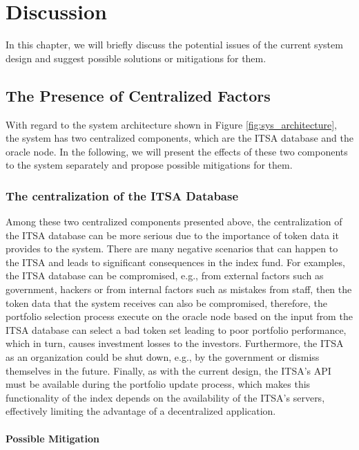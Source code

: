 \chapter{Discussion}\label{chapter:discussion}

In this chapter, we will briefly discuss the potential issues of the current system design and suggest possible solutions or mitigations for them. 



\section{The Presence of Centralized Factors}

With regard to the system architecture shown in Figure \ref{fig:sys_architecture}, the system has two centralized components, which are the ITSA database and the oracle node. In the following, we will present the effects of these two components to the system  separately and propose possible mitigations for them.

\subsection{The centralization of the ITSA Database}

Among these two centralized components presented above, the centralization of the ITSA database can be more serious due to the importance of token data it provides to the system. There are many negative scenarios that can happen to the ITSA and leads to significant consequences in the index fund. For examples, the ITSA database can be compromised, e.g., from external factors such as government, hackers or from internal factors such as mistakes from staff, then the token data that the system receives can also be compromised, therefore, the portfolio selection process execute on the oracle node based on the input from the ITSA database can select a bad token set leading to poor portfolio performance, which in turn, causes investment losses to the investors. Furthermore, the ITSA as an organization could be shut down, e.g., by the government or dismiss themselves in the future. Finally, as with the current design, the ITSA's API must be available during the portfolio update process, which makes this functionality of the index depends on the availability of the ITSA's servers, effectively limiting the advantage of a decentralized application.

\subsubsection{Possible Mitigation}

